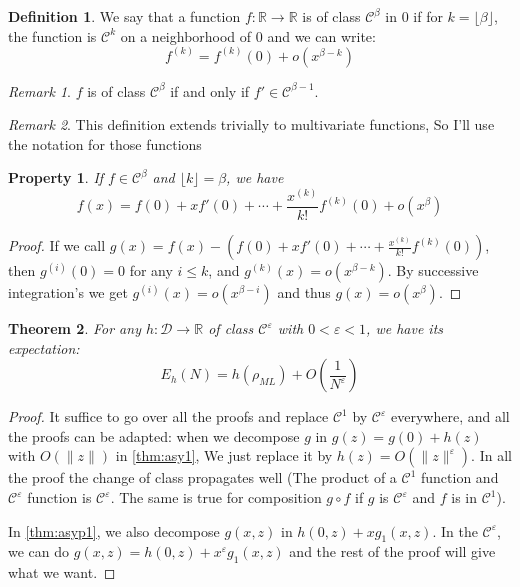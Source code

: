 \documentclass[10pt,a4paper]{report}
\theoremstyle{plain}
\newtheorem{thm}{Theorem}[chapter]
\newtheorem{prop}[thm]{Property}
\theoremstyle{definition}
\newtheorem{defn}{Definition}[chapter]
\theoremstyle{remark}
\newtheorem*{rem}{Remark}
\newcommand{\R}{\ensuremath{\mathbb{R}}}
\renewcommand{\leq}{\leqslant}
\newcommand{\class}[1]{{\mathscr{C}^{#1}}}
\newcommand{\ml}{_{M\!L}}
\begin{document}
\begin{defn}
  We say that a function $f : \R \to \R$ is of class $\class \beta$ in $0$ if
  for $k = \lfloor \beta \rfloor$, the function is $\class k$ on a neighborhood
  of $0$ and we can write:
  \[f^{(k)} = f^{(k)}(0) + o(x^{\beta-k})\]
\end{defn}

\begin{rem}
  $f$ is of class $\class \beta$ if and only if $f' \in \class{\beta-1}$.
\end{rem}

\begin{rem}
This definition extends trivially to multivariate functions, So I'll use the
notation for those functions
\end{rem}

\begin{prop}
  If $f \in \class \beta$ and $\lfloor k \rfloor = \beta$, we have
  \[f(x) = f(0) + xf'(0) + \cdots + \frac{x^{(k)}}{k!}f^{(k)}(0) + o(x^\beta)\]
\end{prop}

\begin{proof}
  If we call $g(x) = f(x) - \left(f(0) + xf'(0) + \cdots +
    \frac{x^{(k)}}{k!}f^{(k)}(0)\right)$, then $g^{(i)}(0) = 0$ for any $i \leq
  k$, and $g^{(k)}(x) = o(x^{\beta - k})$. By successive integration's we get
  $g^{(i)}(x) = o(x^{\beta-i})$ and thus $g(x) = o(x^\beta)$.
\end{proof}

\begin{thm}
  For any $h : \mathcal{D} \to \R$ of class $\class \varepsilon$ with $0 <
  \varepsilon < 1$, we have its expectation:
  \[E_h(N) = h (\rho\ml) + O\left(\frac 1 {N^\varepsilon}\right)\]
\end{thm}

\begin{proof}
  It suffice to go over all the proofs and replace $\class 1$ by $\class
  \varepsilon$ everywhere, and all the proofs can be adapted: when we
  decompose $g$ in $g(z) = g(0) + h(z)$ with $O(\|z\|)$ in \cref{thm:asy1}, We
  just replace it by $h(z) = O(\|z\|^\varepsilon)$. In all the proof the change
  of class propagates well (The product of a $\class 1$ function and $\class \varepsilon$
  function is $\class \varepsilon$. The same is true for composition $g \circ f$
  if $g$ is $\class \varepsilon$ and $f$ is in $\class 1$).

  In \cref{thm:asyp1}, we also decompose $g(x,z)$ in $h(0,z) + xg_1(x,z)$. In
  the $\class \varepsilon$, we can do $g(x,z) = h(0,z) + x^\varepsilon g_1(x,z)$
  and the rest of the proof will give what we want.
\end{proof}
\end{document}
